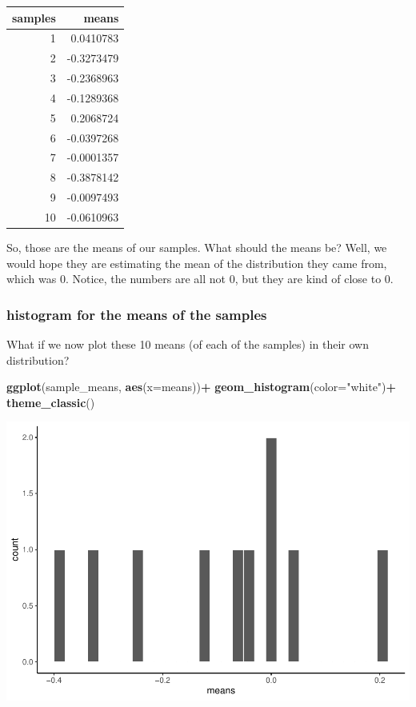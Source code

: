 \documentclass[]{book}
\newenvironment{Shaded}{\begin{snugshade}}{\end{snugshade}}
\newcommand{\KeywordTok}[1]{\textcolor[rgb]{0.13,0.29,0.53}{\textbf{#1}}}
\newcommand{\DataTypeTok}[1]{\textcolor[rgb]{0.13,0.29,0.53}{#1}}
\newcommand{\StringTok}[1]{\textcolor[rgb]{0.31,0.60,0.02}{#1}}
\newcommand{\OperatorTok}[1]{\textcolor[rgb]{0.81,0.36,0.00}{\textbf{#1}}}
\newcommand{\NormalTok}[1]{#1}
\begin{document}
\begin{tabular}{r|r}
\hline
samples & means\\
\hline
1 & 0.0410783\\
\hline
2 & -0.3273479\\
\hline
3 & -0.2368963\\
\hline
4 & -0.1289368\\
\hline
5 & 0.2068724\\
\hline
6 & -0.0397268\\
\hline
7 & -0.0001357\\
\hline
8 & -0.3878142\\
\hline
9 & -0.0097493\\
\hline
10 & -0.0610963\\
\hline
\end{tabular}

So, those are the means of our samples. What should the means be? Well,
we would hope they are estimating the mean of the distribution they came
from, which was 0. Notice, the numbers are all not 0, but they are kind
of close to 0.

\subsubsection{histogram for the means of the
samples}\label{histogram-for-the-means-of-the-samples}

What if we now plot these 10 means (of each of the samples) in their own
distribution?

\begin{Shaded}
\begin{Highlighting}[]
 \KeywordTok{ggplot}\NormalTok{(sample_means, }\KeywordTok{aes}\NormalTok{(}\DataTypeTok{x=}\NormalTok{means))}\OperatorTok{+}
\StringTok{  }\KeywordTok{geom_histogram}\NormalTok{(}\DataTypeTok{color=}\StringTok{"white"}\NormalTok{)}\OperatorTok{+}
\StringTok{  }\KeywordTok{theme_classic}\NormalTok{()}
\end{Highlighting}
\end{Shaded}

\includegraphics{Statistics_Lab_files/figure-latex/unnamed-chunk-118-1.pdf}
\end{document}
